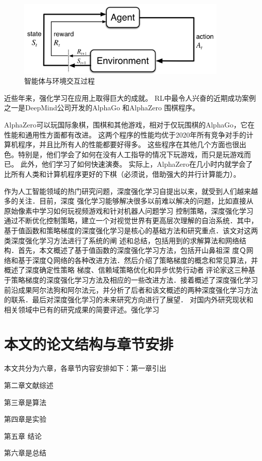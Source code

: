 \begin{figure}[h]
	\centering
	\includegraphics[width=0.9\textwidth]{image/chap01/interaction.png}
	\caption{智能体与环境交互过程\cite{suttonReinforcementLearningIntroduction2018}}
 	\label{fig:interaction-illustration}
\end{figure}

近些年来，强化学习在应用上取得巨大的成就。
RL中最令人兴奋的近期成功案例之一是DeepMind公司开发的AlphaGo \cite{silverMasteringGameGo2016} 和AlphaZero \cite{silverMasteringGameGo2017} 围棋程序。


AlphaZero可以玩国际象棋，围棋和其他游戏，相对于仅玩围棋的AlphaGo，它在性能和通用性方面都有改进。
这两个程序的性能均优于2020年所有竞争对手的计算机程序，并且比所有人的性能都要好得多。
这些程序在其他几个方面也很出色。特别是，他们学会了如何在没有人工指导的情况下玩游戏，而只是玩游戏而已。
此外，他们学习了如何快速演奏。
实际上，AlphaZero在几小时内就学会了比所有人类和计算机程序更好的下棋（必须说，借助强大的并行计算能力）。

作为人工智能领域的热门研究问题，深度强化学习自提出以来，就受到人们越来越多的关注．目前，深度 强化学习能够解决很多以前难以解决的问题，比如直接从原始像素中学习如何玩视频游戏和针对机器人问题学习 控制策略，深度强化学习通过不断优化控制策略，建立一个对视觉世界有更高层次理解的自治系统．其中，基于值函数和策略梯度的深度强化学习是核心的基础方法和研究重点．该文对这两类深度强化学习方法进行了系统的阐 述和总结，包括用到的求解算法和网络结构．首先，本文概述了基于值函数的深度强化学习方法，包括开山鼻祖深 度Ｑ网络和基于深度Ｑ网络的各种改进方法．然后介绍了策略梯度的概念和常见算法，并概述了深度确定性策略 梯度、信赖域策略优化和异步优势行动者评论家这三种基于策略梯度的深度强化学习方法及相应的一些改进方法．接着概述了深度强化学习前沿成果阿尔法狗和阿尔法元，并分析了后者和该文概述的两种深度强化学习方法 的联系．最后对深度强化学习的未来研究方向进行了展望．
对国内外研究现状和相关领域中已有的研究成果的简要评述。强化学习 \cite{suttonReinforcementLearningIntroduction2018}




\section{本文的论文结构与章节安排}
\label{sec:arrangement}

本文共分为六章，各章节内容安排如下：第一章引出 

第二章文献综述

第三章是算法

第四章是实验

第五章 结论

第六章是总结
